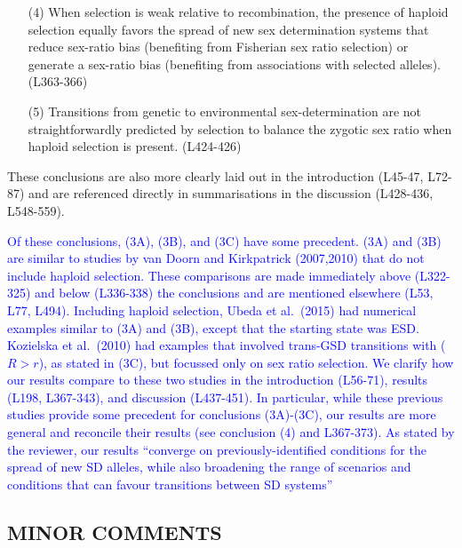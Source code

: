 \documentclass[10pt,letterpaper]{article}
\begin{document}
{\begin{enumerate}
\item[(4)] When selection is weak relative to recombination, the presence of haploid selection equally favors the spread of new sex determination systems that reduce sex-ratio bias (benefiting from Fisherian sex ratio selection) or generate a sex-ratio bias (benefiting from associations with selected alleles). (L363-366)
\item[(5)] Transitions from genetic to environmental sex-determination are not straightforwardly predicted by selection to balance the zygotic sex ratio when haploid selection is present.  (L424-426)
\end{enumerate}
These conclusions are also more clearly laid out in the introduction (L45-47, L72-87) and are referenced directly in summarisations in the discussion (L428-436, L548-559). 
}

\textcolor{blue}{Of these conclusions, (3A), (3B), and (3C) have some precedent. 
(3A) and (3B) are similar to studies by van Doorn and Kirkpatrick (2007,2010) that do not include haploid selection. These comparisons are made immediately above (L322-325) and below (L336-338) the conclusions and are mentioned elsewhere (L53, L77, L494). 
Including haploid selection, Ubeda et al.\ (2015) had numerical examples similar to (3A) and (3B), except that the starting state was ESD. 
Kozielska et al.\ (2010) had examples that involved trans-GSD transitions with ($R>r$), as stated in (3C), but focussed only on sex ratio selection. 
We clarify how our results compare to these two studies in the introduction (L56-71), results (L198, L367-343), and discussion (L437-451).
In particular, while these previous studies provide some precedent for conclusions (3A)-(3C), our results are more general and reconcile their results (see conclusion (4) and L367-373). 
As stated by the reviewer, our results ``converge on previously-identified conditions for the spread of new SD alleles, while also broadening the range of scenarios and conditions that can favour transitions between SD systems''}


\subsection{MINOR COMMENTS}
\end{document}

